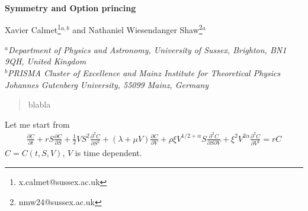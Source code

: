 \documentclass[english,12pt]{article}
\makeatletter
\def\@fmsl@sh#1#2#3{\m@th\ooalign{$\hfil#1\mkern#2/\hfil$\crcr$#1#3$}}
\makeatother
\begin{document}
\makeatletter
\def\fmslash{\@ifnextchar[{\fmsl@sh}{\fmsl@sh[0mu]}}
\def\fmsl@sh[#1]#2{%
  \mathchoice
    {\@fmsl@sh\displaystyle{#1}{#2}}%
    {\@fmsl@sh\textstyle{#1}{#2}}%
    {\@fmsl@sh\scriptstyle{#1}{#2}}%
    {\@fmsl@sh\scriptscriptstyle{#1}{#2}}}
\def\@fmsl@sh#1#2#3{\m@th\ooalign{$\hfil#1\mkern#2/\hfil$\crcr$#1#3$}}
\makeatother

\thispagestyle{empty}
\begin{titlepage}
\boldmath
\begin{center}
  \Large {\bf  Symmetry and Option princing}
    \end{center}
\unboldmath
\vspace{0.2cm}
\begin{center}
{  {\large Xavier Calmet}\footnote{x.calmet@sussex.ac.uk}$^{a,b}$ and {\large Nathaniel Wiesendanger Shaw}\footnote{nmw24@sussex.ac.uk}$^{a}$}
 \end{center}
\begin{center}
$^a${\sl Department of Physics and Astronomy, 
University of Sussex, Brighton, BN1 9QH, United Kingdom
}\\
$^b${\sl PRISMA Cluster of Excellence and Mainz Institute for Theoretical Physics Johannes Gutenberg University, 55099 Mainz, Germany }
\end{center}
\vspace{5cm}
\begin{abstract}
\noindent
blabla
\end{abstract}  
\end{titlepage}




\newpage

Let me start from
\begin{eqnarray}
\label{original MG} \frac{\partial C}{\partial t}+ r S \frac{\partial C}{\partial S} + \frac{1}{2} V S^2 \frac{\partial^2 C}{\partial S^2} +(\lambda + \mu V) \frac{\partial C}{\partial V} +\rho \xi V^{1/2+\alpha} S \frac{\partial^2 C}{\partial S \partial V} +\xi^2 V^{2 \alpha}  \frac{\partial^2 C}{\partial V^2}= r C
\end{eqnarray}
$C=C(t,S,V)$, $V$ is time dependent.
 
\end{document}
